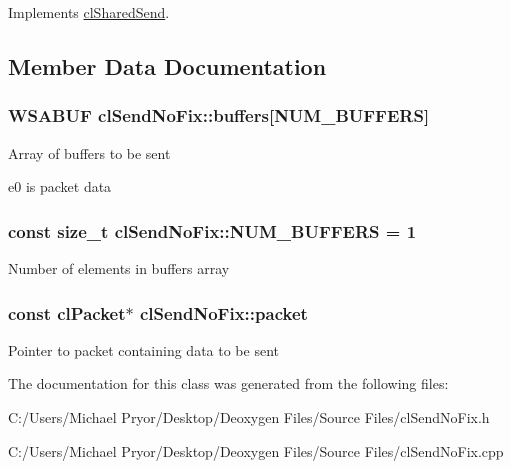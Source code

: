Implements \hyperlink{classcl_shared_send_afb9437432c75b81100927297961413a3}{clSharedSend}.



\subsection{Member Data Documentation}
\hypertarget{classcl_send_no_fix_a110a8eb3acce114667b80a03e9171139}{
\subsubsection[{buffers}]{\setlength{\rightskip}{0pt plus 5cm}WSABUF {\bf clSendNoFix::buffers}\mbox{[}{\bf NUM\_\-BUFFERS}\mbox{]}}}
\label{classcl_send_no_fix_a110a8eb3acce114667b80a03e9171139}
Array of buffers to be sent
\begin{DoxyItemize}
\item e0 is packet data 
\end{DoxyItemize}\hypertarget{classcl_send_no_fix_a587bdc2cbd43afeca12c1f94501cc80a}{
\subsubsection[{NUM\_\-BUFFERS}]{\setlength{\rightskip}{0pt plus 5cm}const size\_\-t {\bf clSendNoFix::NUM\_\-BUFFERS} = 1}}
\label{classcl_send_no_fix_a587bdc2cbd43afeca12c1f94501cc80a}
Number of elements in buffers array \hypertarget{classcl_send_no_fix_a4e895114dfe8af11712e74afbc51b2c4}{
\subsubsection[{packet}]{\setlength{\rightskip}{0pt plus 5cm}const {\bf clPacket}$\ast$ {\bf clSendNoFix::packet}}}
\label{classcl_send_no_fix_a4e895114dfe8af11712e74afbc51b2c4}
Pointer to packet containing data to be sent 

The documentation for this class was generated from the following files:\begin{DoxyCompactItemize}
\item 
C:/Users/Michael Pryor/Desktop/Deoxygen Files/Source Files/clSendNoFix.h\item 
C:/Users/Michael Pryor/Desktop/Deoxygen Files/Source Files/clSendNoFix.cpp\end{DoxyCompactItemize}
